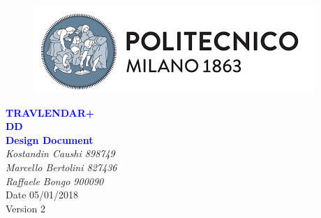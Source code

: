 


	\begin{titlepage}
		\centering
		\begin{figure}
			\vspace*{0mm}
			\centering
			\includegraphics[scale=0.7]{Images/Polimi_Logo}
			\\[3cm]
		\end{figure}		
		\vspace{65mm}
		\textcolor{Blue}{\textbf{\Huge TRAVLENDAR+}}\\[15mm]
		\textcolor{Blue}{\textbf{\huge DD}}\\[4mm]
		{\textcolor{Blue}{\textbf{\Large{Design Document}}}}\\
		\vspace{30mm}
		\textit{\large Kostandin Caushi 898749}\\[3mm]
		\textit{\large Marcello Bertolini 827436}\\[3mm]
		\textit{\large Raffaele Bongo 900090}\\[3mm]
		\vspace{30mm}
		Date 05/01/2018\\
		\vspace{10mm}
		Version 2
	\end{titlepage}

	\begin{center}
	\vspace*{-5mm}
	\renewcommand{\contentsname}{Table of Contents}
	\tableofcontents
	\newpage
	\listoffigures
	\newpage
    \end{center}
	
	\ttfamily
	\setlength{\emergencystretch}{45pt}
	
	\newpage
	
	\newpage
	
	\newpage
	
	\newpage
	
	\newpage
	
	\newpage
	

